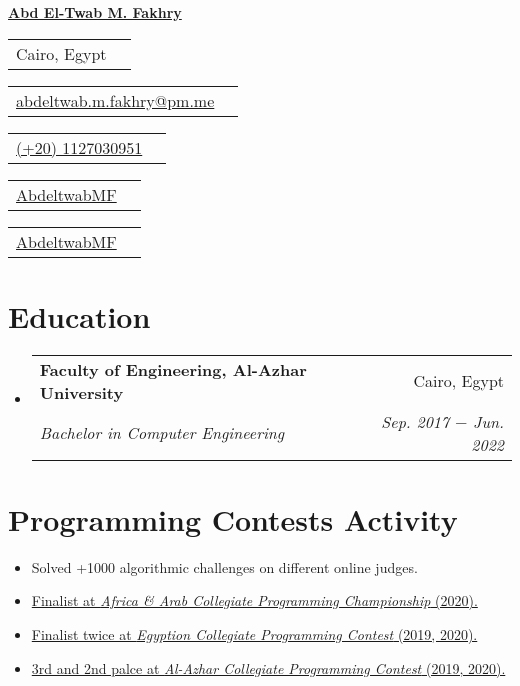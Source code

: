 \documentclass[letterpaper, 11pt]{article}
\makeatletter
\newcommand{\infoItem}[3] {
  \begin{tabular}{lr}
    {\color{#1}\faIcon{#2} {#3}}
  \end{tabular}
}
\newcommand{\educationItem}[4] {
  \vspace{-1pt}\item
  \begin{tabular*}{0.97\textwidth}[t]{l@{\extracolsep{\fill}}r}
    \textbf{#1} & #2 \\
    \textit{\small #3} & \textit{\small #4} \\
  \end{tabular*}\vspace{-5pt}
}
\newcommand{\progContItem}[1] {\item\small{#1 \vspace{-2pt}}}
\makeatother
\begin{document}
\textbf{\href{https://twitter.com/AbdeltwabMF}{\Huge{Abd El-Twab M. Fakhry}}} \\[2pt]

\begin{minipage}[t]{0.155\textwidth}
  \infoItem{RedViolet}{location-arrow}{Cairo, Egypt}
\end{minipage}
\begin{minipage}[t]{0.295\textwidth}
  \infoItem{RoyalPurple}{envelope}{\href{mailto:abdeltwab.m.fakhry@protonmail.com}{abdeltwab.m.fakhry@pm.me}}
\end{minipage}
\begin{minipage}[t]{0.19\textwidth}
  \infoItem{JungleGreen}{mobile-alt}{\href{tel:+201127030951}{(+20) 1127030951}}
\end{minipage}
\begin{minipage}[t]{0.165\textwidth}
  \infoItem{RoyalBlue}{linkedin}{\href{https://www.linkedin.com/in/abdeltwabmf/}{AbdeltwabMF}}
\end{minipage}
\begin{minipage}[t]{0.165\textwidth}
  \infoItem{Black}{github}{\href{https://github.com/AbdeltwabMF}{AbdeltwabMF}}
\end{minipage}

\section{Education}
\begin{itemize}[leftmargin=*]
  \educationItem{\faIcon{university} Faculty of Engineering, Al-Azhar University}{Cairo, Egypt}{Bachelor in Computer Engineering}{Sep. 2017 $-$ Jun. 2022}
\end{itemize}

\section{Programming Contests Activity}
\begin{itemize}[leftmargin=*]
  \progContItem{Solved +1000 algorithmic challenges on different online judges.}
  \progContItem{\href{https://icpc.global/ICPCID/S6R4YNB7PW7D}{Finalist at \emph{Africa \& Arab Collegiate Programming Championship} (2020).}}
  \progContItem{\href{https://icpc.global/ICPCID/S6R4YNB7PW7D}{Finalist twice at \emph{Egyption Collegiate Programming Contest} (2019, 2020).}}
  \progContItem{\href{https://icpc.global/ICPCID/S6R4YNB7PW7D}{3rd and 2nd palce at \emph{Al-Azhar Collegiate Programming Contest} (2019, 2020).}}
\end{itemize}
\end{document}
